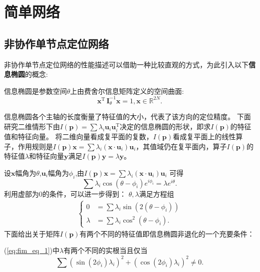 \chapter{简单网络}\label{cha:content3}

\section{非协作单节点定位网络}\label{section:circle_general}
非协作单节点定位网络的性能描述可以借助一种比较直观的方式，为此引入以下\textbf{信息椭圆}的概念\cite{LimitBound}:
\begin{definition}
信息椭圆是参数空间$\theta$上由费舍尔信息矩阵定义的空间曲面:
\begin{equation}\label{eq:ie}
\bm{x}^{\textrm{T}} \,\bm{I}_{\theta}^{-1}\bm{x}=1,\bm{x}\in \mathbb{R}^{2N}.
\end{equation}
\end{definition}
信息椭圆各个主轴的长度衡量了特征值的大小，代表了该方向的定位精度。
下面研究二维情形下由$I(\bm{p})=\sum \lambda_i \bm{u}_i \bm{u}_i^{\textrm{T}} $决定的信息椭圆的形状，即求$I(\bm{p})$的特征值和特征向量。
将二维向量看成复平面的复数，$I(\bm{p})$看成复平面上的线性算子，作用规则是$I(\bm{p})\bm{x}=\sum \lambda_i (\bm{x}\cdot\bm{u}_i)\bm{u}_i$，其值域仍在复平面内，算子$I(\bm{p})$的特征值$\lambda$和特征向量$\bm{y}$满足$I(\bm{p})\bm{y}=\lambda \bm{y}$。


设$\bm{x}$幅角为$\theta$,$\bm{u}_i$幅角为$\phi_i$,由$I(\bm{p})\bm{x}=\sum \lambda_i (\bm{x}\cdot\bm{u}_i)\bm{u}_i$
可得
\begin{equation}
\sum \lambda_i \cos(\theta-\phi_i)e^{i\phi_i}=\lambda e^{i\theta}.
\end{equation}
利用虚部为0的条件，可以进一步得到：
$\theta,\lambda$满足方程组
\begin{align}\label{eq:fim_eq_1}
\begin{cases}
0&=\sum \lambda_i \sin(2(\theta-\phi_i))\\
\lambda&=\sum \lambda_i \cos^2(\theta-\phi_i).
\end{cases}
\end{align}
下面给出关于矩阵$I(\bm{p})$有两个不同的特征值即信息椭圆非退化的一个充要条件：
\begin{theorem}
(\ref{eq:fim_eq_1})中$\lambda$有两个不同的实根当且仅当
\begin{equation}
\sum (\sin(2\phi_i)\lambda_i)^2+(\cos(2\phi_i)\lambda_i)^2 \neq 0.
\end{equation}
\end{theorem}

